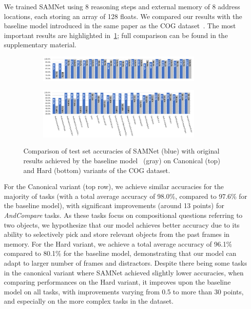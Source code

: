 We trained SAMNet using 8 reasoning steps and external memory of 8 address locations, each storing an array of 128 floats. 
We compared our results with the baseline model introduced in the same paper as the COG dataset~\cite{yang2018dataset}.
The most important results are highlighted in~\cref{fig:samnet_cog_detailed}; full comparison can be found in the supplementary material.%

\begin{figure}[htb]
	\centering
	\begin{subfigure}{\textwidth}
		\centering
		\includegraphics[width=0.9\textwidth]{img/results/samnet_cog_orig_canonical_no_labels.png}
	\end{subfigure}%
	\newline
	\begin{subfigure}{\textwidth}
		\centering
		\includegraphics[width=0.9\textwidth]{img/results/samnet_cog_orig_hard.png}
	\end{subfigure}%
	\caption{Comparison of test set accuracies of SAMNet (blue) with original results achieved by the 
		baseline model~\cite{yang2018dataset} (gray) on Canonical (top) and Hard (bottom) variants of the COG dataset.}
	\label{fig:samnet_cog_detailed}
\end{figure}

For the Canonical variant (top row), we achieve similar accuracies for the majority of tasks (with a total average accuracy of 98.0\%, 
compared to 97.6\% for the baseline model), with significant improvements (around 13 points) for \textit{AndCompare} tasks.
As these tasks focus on compositional questions referring to two objects, we hypothesize that our model achieves better 
accuracy due to its ability to selectively pick and store relevant objects from the past frames in memory.
For the Hard variant, we achieve a total average accuracy of 96.1\% compared to 80.1\% for the baseline model, demonstrating
that our model can adapt to larger number of frames and distractors.
Despite there being some tasks in the canonical variant where SAMNet achieved slightly lower accuracies,
when comparing performances on the Hard variant, it improves upon the baseline model on all tasks, 
with improvements varying from 0.5 to more than 30 points, and especially on the more complex tasks in the dataset.

